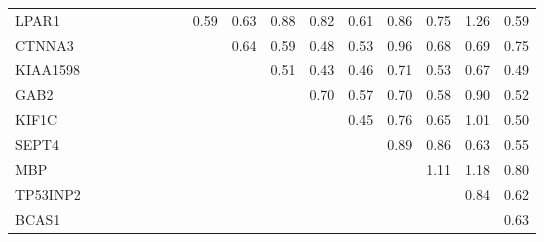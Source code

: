 \begin{longtable}{lrrrrrrrrrrrrrrrr}
LPAR1    &              &            &            &               &            &             &             &         0.59 &           0.63 &       0.88 &        0.82 &        0.61 &      0.86 &           0.75 &        1.26 &          0.59 \\
CTNNA3   &              &            &            &               &            &             &             &              &           0.64 &       0.59 &        0.48 &        0.53 &      0.96 &           0.68 &        0.69 &          0.75 \\
KIAA1598 &              &            &            &               &            &             &             &              &                &       0.51 &        0.43 &        0.46 &      0.71 &           0.53 &        0.67 &          0.49 \\
GAB2     &              &            &            &               &            &             &             &              &                &            &        0.70 &        0.57 &      0.70 &           0.58 &        0.90 &          0.52 \\
KIF1C    &              &            &            &               &            &             &             &              &                &            &             &        0.45 &      0.76 &           0.65 &        1.01 &          0.50 \\
SEPT4    &              &            &            &               &            &             &             &              &                &            &             &             &      0.89 &           0.86 &        0.63 &          0.55 \\
MBP      &              &            &            &               &            &             &             &              &                &            &             &             &           &           1.11 &        1.18 &          0.80 \\
TP53INP2 &              &            &            &               &            &             &             &              &                &            &             &             &           &                &        0.84 &          0.62 \\
BCAS1    &              &            &            &               &            &             &             &              &                &            &             &             &           &                &             &          0.63 \\
\end{longtable}


